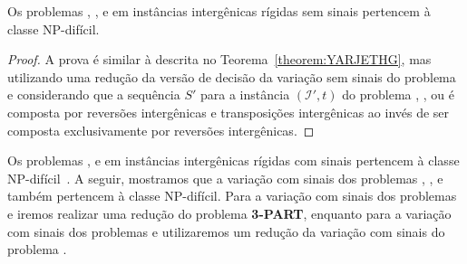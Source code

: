 \begin{theorem}\label{theorem:RDOZOOIB}
Os problemas \SbIRT, \SbIRTI, \SbIRTM{} e \SbIRTMI{} em instâncias intergênicas rígidas sem sinais pertencem à classe NP-difícil.
\end{theorem}
\begin{proof}
A prova é similar à descrita no Teorema~\ref{theorem:YARJETHG}, mas utilizando uma redução da versão de decisão da variação sem sinais do problema \SbRT{} e considerando que a sequência $S'$ para a instância $(\mathcal{I'},t)$ do problema \SbIRT{}, \SbIRTI{}, \SbIRTM{} ou \SbIRTMI{} é composta por reversões intergênicas e transposições intergênicas ao invés de ser composta exclusivamente por reversões intergênicas.
\end{proof}

Os problemas \SbIR{}, \SbIRT{} e \SbIRTM{} em instâncias intergênicas rígidas com sinais pertencem à classe NP-difícil~\cite{2021a-oliveira-etal,2021b-oliveira-etal}. A seguir, mostramos que a variação com sinais dos problemas \SbIRM{}, \SbIRMI{}, \SbIRTI{} e \SbIRTMI{} também pertencem à classe NP-difícil. Para a variação com sinais dos problemas \SbIRM{} e \SbIRMI{} iremos realizar uma redução do problema \textbf{3-PART}, enquanto para a variação com sinais dos problemas \SbIRTI{} e \SbIRTMI{} utilizaremos um redução da variação com sinais do problema \SbRT{}.

